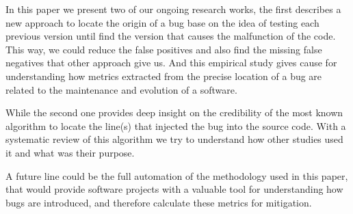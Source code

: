 \documentclass[a4paper]{article}
\begin{document}
In this paper we present two of our ongoing research works, the first describes a new approach to locate the origin of a bug base on the idea of testing each previous version until find the version that causes the malfunction of the code. This way, we could reduce the false positives and also find the missing false negatives that other approach give us. And this empirical study gives cause for understanding how metrics extracted from the precise location of a bug are related to the maintenance and evolution of a software.

While the second one provides deep insight on the credibility of the most known algorithm to locate the line(s) that injected the bug into the source code. With a systematic review of this algorithm we try to understand how other studies used it and what was their purpose.

A future line could be the full automation of the methodology used in this paper, that would provide software projects with a valuable tool for understanding how bugs are introduced, and therefore calculate these metrics for mitigation.

% 
%
\end{document}
